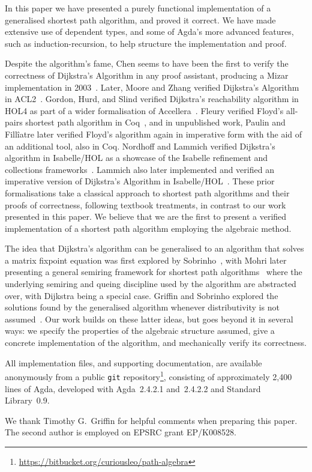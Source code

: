 In this paper we have presented a purely functional implementation of a generalised shortest path algorithm, and proved it correct.
We have made extensive use of dependent types, and some of Agda's more advanced features, such as induction-recursion, to help structure the implementation and proof.

Despite the algorithm's fame, Chen seems to have been the first to verify the correctness of Dijkstra's Algorithm in any proof assistant, producing a Mizar implementation in 2003~\cite{chen:dijkstra:2003}.
Later, Moore and Zhang verified Dijkstra's Algorithm in ACL2~\cite{moore:proof-pearl:2005}.
Gordon, Hurd, and Slind verified Dijkstra's reachability algorithm in HOL4 as part of a wider formalisation of Accellera~\cite{gordon:executing:2003}.
Fleury verified Floyd's all-pairs shortest path algorithm in Coq~\cite{fleury:implantation:1990}, and in unpublished work, Paulin and Fill\^iatre later verified Floyd's algorithm again in imperative form with the aid of an additional tool, also in Coq.
Nordhoff and Lammich verified Dijkstra's algorithm in Isabelle/HOL as a showcase of the Isabelle refinement and collections frameworks~\cite{nordhoff-dijkstra-2012}.
Lammich also later implemented and verified an imperative version of Dijkstra's Algorithm in Isabelle/HOL~\cite{lammich:refinement:2015}.
These prior formalisations take a classical approach to shortest path algorithms and their proofs of correctness, following textbook treatments, in contrast to our work presented in this paper.
We believe that we are the first to present a verified implementation of a shortest path algorithm employing the algebraic method.

The idea that Dijkstra's algorithm can be generalised to an algorithm that solves a matrix fixpoint equation was first explored by Sobrinho~\cite{sobrinho_algebra_2001}, with Mohri later presenting a general semiring framework for shortest path algorithms~\cite{mohri:semiring:2002} where the underlying semiring and queing discipline used by the algorithm are abstracted over, with Dijkstra being a special case.
Griffin and Sobrinho explored the solutions found by the generalised algorithm whenever distributivity is not assumed~\cite{sobrinho_routing_2010}.
Our work builds on these latter ideas, but goes beyond it in several ways: we specify the properties of the algebraic structure assumed, give a concrete implementation of the algorithm, and mechanically verify its correctness.

All implementation files, and supporting documentation, are available anonymously from a public \texttt{git} repository\footnote{\url{https://bitbucket.org/curiousleo/path-algebra}}, consisting of approximately 2,400 lines of Agda, developed with Agda~2.4.2.1 and~2.4.2.2 and Standard Library~0.9.

We thank Timothy G.~Griffin for helpful comments when preparing this paper.
The second author is employed on EPSRC grant EP/K008528.
